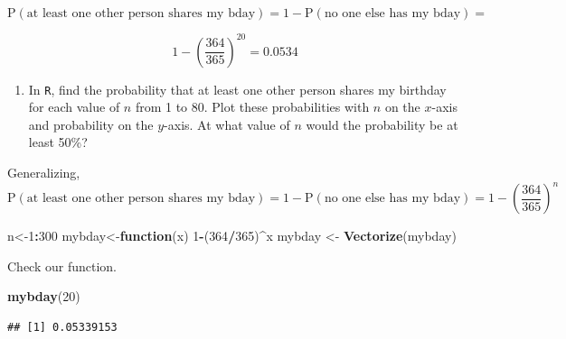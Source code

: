 \documentclass[
]{book}
\newenvironment{Shaded}{\begin{snugshade}}{\end{snugshade}}
\newcommand{\ControlFlowTok}[1]{\textcolor[rgb]{0.13,0.29,0.53}{\textbf{#1}}}
\newcommand{\DataTypeTok}[1]{\textcolor[rgb]{0.13,0.29,0.53}{#1}}
\newcommand{\DecValTok}[1]{\textcolor[rgb]{0.00,0.00,0.81}{#1}}
\newcommand{\KeywordTok}[1]{\textcolor[rgb]{0.13,0.29,0.53}{\textbf{#1}}}
\newcommand{\NormalTok}[1]{#1}
\newcommand{\OperatorTok}[1]{\textcolor[rgb]{0.81,0.36,0.00}{\textbf{#1}}}
\newcommand{\StringTok}[1]{\textcolor[rgb]{0.31,0.60,0.02}{#1}}
\providecommand{\tightlist}{%
  \setlength{\itemsep}{0pt}\setlength{\parskip}{0pt}}
\begin{document}
\[
\mbox{P}(\mbox{at least one other person shares my bday})=1-\mbox{P}(\mbox{no one else has my bday}) = 
\]

\[
1-\left( \frac{364}{365}\right)^{20} = 0.0534
\]

\begin{enumerate}
\def\labelenumi{\alph{enumi}.}
\setcounter{enumi}{1}
\tightlist
\item
  In \texttt{R}, find the probability that at least one other person shares my birthday for each value of \(n\) from 1 to 80. Plot these probabilities with \(n\) on the \(x\)-axis and probability on the \(y\)-axis. At what value of \(n\) would the probability be at least 50\%?
\end{enumerate}

Generalizing,
\[
\mbox{P}(\mbox{at least one other person shares my bday})=1-\mbox{P}(\mbox{no one else has my bday}) = 1-\left( \frac{364}{365}\right)^{n}
\]

\begin{Shaded}
\begin{Highlighting}[]
\NormalTok{n<-}\DecValTok{1}\OperatorTok{:}\DecValTok{300}
\NormalTok{mybday<-}\ControlFlowTok{function}\NormalTok{(x) }\DecValTok{1}\OperatorTok{-}\NormalTok{(}\DecValTok{364}\OperatorTok{/}\DecValTok{365}\NormalTok{)}\OperatorTok{^}\NormalTok{x}
\NormalTok{mybday <-}\StringTok{ }\KeywordTok{Vectorize}\NormalTok{(mybday)}
\end{Highlighting}
\end{Shaded}

Check our function.

\begin{Shaded}
\begin{Highlighting}[]
\KeywordTok{mybday}\NormalTok{(}\DecValTok{20}\NormalTok{)}
\end{Highlighting}
\end{Shaded}

\begin{verbatim}
## [1] 0.05339153
\end{verbatim}

\begin{Shaded}
\end{Shaded}
\end{document}
